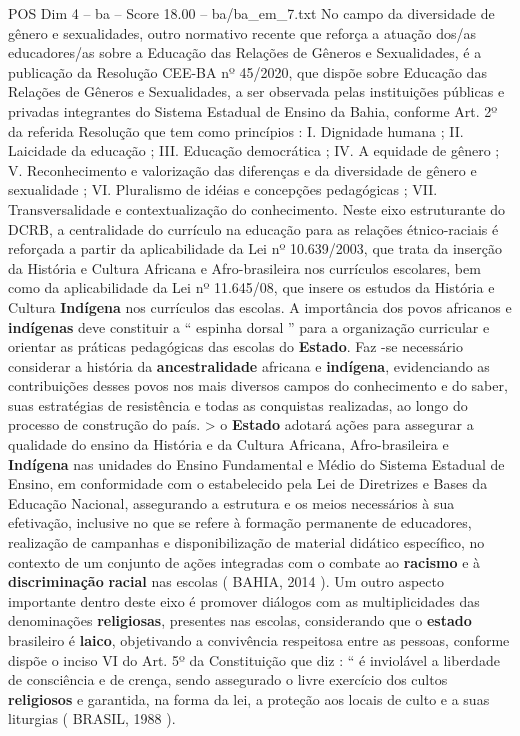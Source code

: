 \begin{textsample}{POS Dim 4 – ba – Score 18.00 – ba/ba\_em\_7.txt}
No campo da diversidade de gênero e sexualidades, outro normativo recente que reforça a atuação dos/as educadores/as sobre a Educação das Relações de Gêneros e Sexualidades, é a publicação da Resolução CEE-BA nº 45/2020, que dispõe sobre Educação das Relações de Gêneros e Sexualidades, a ser observada pelas instituições públicas e privadas integrantes do Sistema Estadual de Ensino da Bahia, conforme Art. 2º da referida Resolução que tem como princípios : I.
Dignidade humana ; II.
Laicidade da educação ; III.
Educação democrática ; IV.
A equidade de gênero ; V.
Reconhecimento e valorização das diferenças e da diversidade de gênero e sexualidade ; VI.
Pluralismo de idéias e concepções pedagógicas ; VII.
Transversalidade e contextualização do conhecimento.
Neste eixo estruturante do DCRB, a centralidade do currículo na educação para as relações étnico-raciais é reforçada a partir da aplicabilidade da Lei nº 10.639/2003, que trata da inserção da História e Cultura Africana e Afro-brasileira nos currículos escolares, bem como da aplicabilidade da Lei nº 11.645/08, que insere os estudos da História e Cultura \textbf{Indígena} nos currículos das escolas.
A importância dos povos africanos e \textbf{indígenas} deve constituir a “ espinha dorsal ” para a organização curricular e orientar as práticas pedagógicas das escolas do \textbf{Estado}.
Faz -se necessário considerar a história da \textbf{ancestralidade} africana e \textbf{indígena}, evidenciando as contribuições desses povos nos mais diversos campos do conhecimento e do saber, suas estratégias de resistência e todas as conquistas realizadas, ao longo do processo de construção do país. > o \textbf{Estado} adotará ações para assegurar a qualidade do ensino da História e da Cultura Africana, Afro-brasileira e \textbf{Indígena} nas unidades do Ensino Fundamental e Médio do Sistema Estadual de Ensino, em conformidade com o estabelecido pela Lei de Diretrizes e Bases da Educação Nacional, assegurando a estrutura e os meios necessários à sua efetivação, inclusive no que se refere à formação permanente de educadores, realização de campanhas e disponibilização de material didático específico, no contexto de um conjunto de ações integradas com o combate ao \textbf{racismo} e à \textbf{discriminação} \textbf{racial} nas escolas ( BAHIA, 2014 ).
Um outro aspecto importante dentro deste eixo é promover diálogos com as multiplicidades das denominações \textbf{religiosas}, presentes nas escolas, considerando que o \textbf{estado} brasileiro é \textbf{laico}, objetivando a convivência respeitosa entre as pessoas, conforme dispõe o inciso VI do Art. 5º da Constituição que diz : “ é inviolável a liberdade de consciência e de crença, sendo assegurado o livre exercício dos cultos \textbf{religiosos} e garantida, na forma da lei, a proteção aos locais de culto e a suas liturgias ( BRASIL, 1988 ).

\end{textsample}
